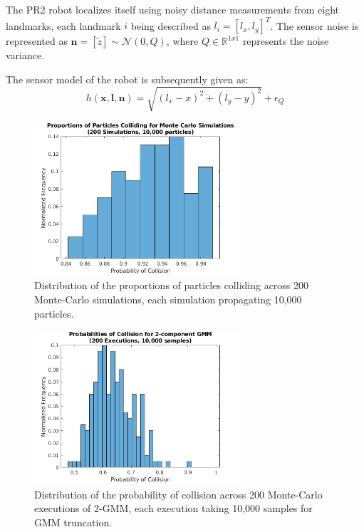 \documentclass[journal]{IEEEtran}
\begin{document}
The PR2 robot localizes itself using noisy distance measurements from eight landmarks, each landmark $i$ being described as $l_i = [l_x,l_y]^T$. The sensor noise is represented as $\textbf{n} = [\tilde{z}] \sim \mathcal{N}(0,Q)$, where $Q \in \mathbb{R}^{1x1}$ represents the noise variance.

The sensor model of the robot is subsequently given as:
$$h(\textbf{x},\textbf{l},\textbf{n}) = \sqrt{(l_x - x)^2 + (l_y - y)^2} + \epsilon_Q$$


\begin{figure}[!t]
\centering
\includegraphics[width=3in]{mc_props.png}
\caption{Distribution of the proportions of particles colliding across 200 Monte-Carlo simulations, each simulation propagating 10,000 particles.}
\label{result_1}
\end{figure}

\begin{figure}[!t]
\centering
\includegraphics[width=3in]{GMM2_props.png}
\caption{Distribution of the probability of collision across 200 Monte-Carlo executions of 2-GMM, each execution taking 10,000 samples for GMM truncation.}
\label{result_2}
\end{figure}
\end{document}
